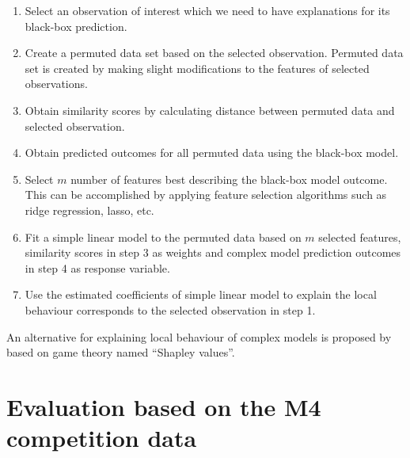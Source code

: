 \documentclass[11pt,a4paper,]{article}
\providecommand{\tightlist}{%
  \setlength{\itemsep}{0pt}\setlength{\parskip}{0pt}}
\begin{document}
\begin{enumerate}
\def\labelenumi{\arabic{enumi}.}
\tightlist
\item
  Select an observation of interest which we need to have explanations for its black-box prediction.
\item
  Create a permuted data set based on the selected observation. Permuted data set is created by making slight modifications to the features of selected observations.
\item
  Obtain similarity scores by calculating distance between permuted data and selected observation.
\item
  Obtain predicted outcomes for all permuted data using the black-box model.
\item
  Select \(m\) number of features best describing the black-box model outcome. This can be accomplished by applying feature selection algorithms such as ridge regression, lasso, etc.
\item
  Fit a simple linear model to the permuted data based on \(m\) selected features, similarity scores in step 3 as weights and complex model prediction outcomes in step 4 as response variable.
\item
  Use the estimated coefficients of simple linear model to explain the local behaviour corresponds to the selected observation in step 1.
\end{enumerate}

An alternative for explaining local behaviour of complex models is proposed by \textcite{lundberg2017unified} based on game theory named ``Shapley values''.

\hypertarget{results1}{%
\section{Evaluation based on the M4 competition data}\label{results1}}
\end{document}
